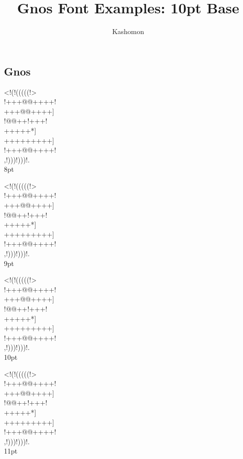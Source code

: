 \documentclass[10pt]{article}
\begin{document}
\title{Gnos Font Examples: 10pt Base}
\author{Kashomon}
\maketitle

\begin{center}
\section*{Gnos}
{
{}
\gnoseight%
<!(!(((((!>\\
!+++@@++++!\\
+++@@++++]\\
!@@++!+++!\\
+++++*]\\
+++++++++]\\
!+++@@++++!\\
,!)))!)))!.\\
}
8pt

{
\gnosnine%
<!(!(((((!>\\
!+++@@++++!\\
+++@@++++]\\
!@@++!+++!\\
+++++*]\\
+++++++++]\\
!+++@@++++!\\
,!)))!)))!.\\
}
9pt


{
\gnosten%
<!(!(((((!>\\
!+++@@++++!\\
+++@@++++]\\
!@@++!+++!\\
+++++*]\\
+++++++++]\\
!+++@@++++!\\
,!)))!)))!.\\
}
10pt

\newpage

{
\gnoseleven%
<!(!(((((!>\\
!+++@@++++!\\
+++@@++++]\\
!@@++!+++!\\
+++++*]\\
+++++++++]\\
!+++@@++++!\\
,!)))!)))!.\\
}
11pt


\end{center}
\end{document}
